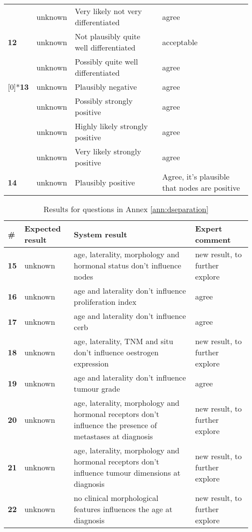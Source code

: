 \begin{table}[h]
\begin{tabularx}{\textwidth}{lllX}
		 \multirow{3}[0]{*}{\textbf{12}} & unknown & Very likely not very differentiated & agree \\
		      & unknown & Not plausibly quite well differentiated & acceptable \\
		      & unknown & Possibly quite well differentiated & agree \\
	      \addlinespace
		 \multirow{4}[0]{*}{\textbf{13}} & unknown & Plausibly negative & agree \\
		      & unknown & Possibly strongly positive & agree \\
		      & unknown & Highly likely strongly positive & agree \\
		      & unknown & Very likely strongly positive & agree \\
		\addlinespace
		\textbf{14} & unknown & Plausibly positive & Agree, it's plausible that nodes are positive \\
		\bottomrule
		\end{tabularx}
	\label{tab:resultsconditionalquestions}
\end{table}

\begin{table}[h]
	\centering
	\caption{Results for questions in Annex \ref{ann:dseparation}}
	\begin{tabularx}{\textwidth}{llXX}
		\toprule
		\textbf{\#} & Expected result & System result & Expert comment  \\
		\midrule	
		\textbf{15} & unknown & age, laterality, morphology and hormonal status don't influence nodes & new result, to further explore \\
		\addlinespace
		\textbf{16} & unknown & age and laterality don't influence proliferation index & agree \\
		\addlinespace
		\textbf{17} & unknown & age and laterality don't influence cerb & agree \\
		\addlinespace
		\textbf{18} & unknown & age, laterality, TNM and situ don't influence oestrogen expression & new result, to further explore \\
		\addlinespace
		\textbf{19} & unknown & age and laterality don't influence tumour grade & agree \\
		\addlinespace
		\textbf{20} & unknown & age, laterality, morphology and hormonal receptors don't influence the presence of metastases at diagnosis & new result, to further explore \\
		\addlinespace
		\textbf{21} & unknown & age, laterality, morphology and hormonal receptors don't influence tumour dimensions at diagnosis & new result, to further explore \\
		\addlinespace
		\textbf{22} & unknown & no clinical morphological features influences the age at diagnosis & new result, to further explore \\
		\bottomrule
		\end{tabularx}
	\label{tab:resultsdseparationquestions}
\end{table}

